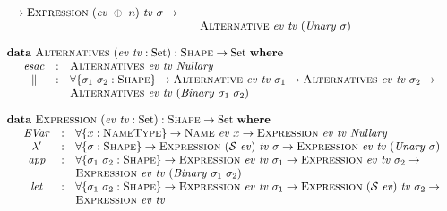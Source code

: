 \documentclass[a4paper]{jfp}
\begin{document}
\begin{figure}
\begin{displaymath}
\begin{array}{l}
\begin{array}{lll}
      \rightarrow \textsc{Expression}\ (\mathit{ev}\ \oplus\ n)\ \mathit{tv}\ \sigma \rightarrow \\ & & \textsc{Alternative}\ \mathit{ev}\ \mathit{tv}\
   (\mathit{Unary}\ \sigma)
         \end{array} \\ \\
         \textbf{data}\ \textsc{Alternatives}\ (\mathit{ev}\ \mathit{tv} : \text{Set}) : \textsc{Shape} \rightarrow \text{Set}\ \textbf{where} \\
         \quad \begin{array}{cll}
            \mathit{esac} & : & \textsc{Alternatives}\ \mathit{ev}\ \mathit{tv}\ \mathit{Nullary} \\
            \Vert & : &  \forall \{\sigma_1\ \sigma_2 : \textsc{Shape}\} \rightarrow \textsc{Alternative}\ \mathit{ev}\ \mathit{tv}\ \sigma_1
      \rightarrow \textsc{Alternatives}\ \mathit{ev}\ \mathit{tv}\ \sigma_2 \rightarrow \\ & &  \textsc{Alternatives}\ \mathit{ev}\ \mathit{tv}\
   (\mathit{Binary}\ \sigma_1\ \sigma_2) 
         \end{array} \\ \\
         \textbf{data}\ \textsc{Expression}\ (\mathit{ev}\ \mathit{tv} : \text{Set}) : \textsc{Shape} \rightarrow \text{Set}\ \textbf{where} \\
      \quad \begin{array}{cll}
         \mathit{EVar} & : & \forall \{x : \textsc{NameType}\} \rightarrow \textsc{Name}\ \mathit{ev}\ x \rightarrow \textsc{Expression}\ \mathit{ev}\
   \mathit{tv}\ \mathit{Nullary} \\
         \lambda' & : & \forall \{ \sigma : \textsc{Shape} \} \rightarrow \textsc{Expression}\ (\mathcal{S}\ \mathit{ev})\ \mathit{tv}\ \sigma \rightarrow
   \textsc{Expression}\ \mathit{ev}\ \mathit{tv}\ (\mathit{Unary\ \sigma}) \\
         \mathit{app} & : & \forall \{ \sigma_1\ \sigma_2 : \textsc{Shape} \} \rightarrow \textsc{Expression}\ \mathit{ev}\ \mathit{tv}\ \sigma_1
   \rightarrow \textsc{Expression}\ \mathit{ev}\ \mathit{tv}\ \sigma_2 \rightarrow  \\ & & \textsc{Expression}\ \mathit{ev}\ \mathit{tv}\ (\mathit{Binary}
\ \sigma_1\ \sigma_2) \\
         \mathit{let} & : & \forall \{ \sigma_1\ \sigma_2 : \textsc{Shape} \} \rightarrow \textsc{Expression}\ \mathit{ev}\ \mathit{tv}\ \sigma_1
   \rightarrow \textsc{Expression}\ (\mathcal{S}\ \mathit{ev})\ \mathit{tv}\ \sigma_2 \rightarrow \\ &&\textsc{Expression}\ \mathit{ev}\ \mathit{tv}\

\end{array}
\end{array}
\end{displaymath}
\end{figure}
\end{document}
